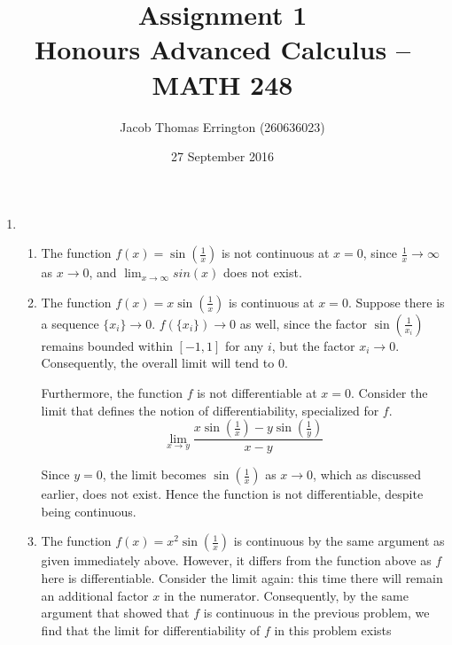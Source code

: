 \documentclass[letterpaper,11pt]{article}
\author{Jacob Thomas Errington (260636023)}
\title{Assignment 1\\Honours Advanced Calculus -- MATH 248}
\date{27 September 2016}
\begin{document}
\maketitle

\begin{enumerate}
    \item
        \begin{enumerate}
            \item
                The function $f(x) = \sin{(\frac{1}{x})}$ is not continuous at
                $x = 0$, since $\frac{1}{x} \to \infty$ as $x \to 0$, and
                $\lim_{x\to\infty} {sin(x)}$ does not exist.

            \item
                The function $f(x) = x \sin{(\frac{1}{x})}$ is continuous at
                $x = 0$. Suppose there is a sequence $\{x_i\} \to 0$.
                $f(\{x_i\}) \to 0$ as well, since the factor
                $\sin{(\frac{1}{x_i})}$ remains bounded within $[-1, 1]$ for
                any $i$, but the factor $x_i \to 0$. Consequently, the overall
                limit will tend to $0$.

                Furthermore, the function $f$ is not differentiable at $x=0$.
                Consider the limit that defines the notion of
                differentiability, specialized for $f$.
                \begin{equation*}
                    \lim_{x\to y}{
                        \frac
                        {x \sin{(\frac{1}{x})} - y \sin{(\frac{1}{y})}}
                        {x - y}
                    }
                \end{equation*}

                Since $y=0$, the limit becomes $\sin{(\frac{1}{x})}$ as
                $x \to 0$, which as discussed earlier, does not exist. Hence
                the function is not differentiable, despite being continuous.

            \item
                The function $f(x) = x^2 \sin{(\frac{1}{x})}$ is continuous by
                the same argument as given immediately above. However, it
                differs from the function above as $f$ here is differentiable.
                Consider the limit again: this time there will remain an
                additional factor $x$ in the numerator. Consequently, by the
                same argument that showed that $f$ is continuous in the
                previous problem, we find that the limit for differentiability
                of $f$ in this problem exists
        \end{enumerate}


\end{enumerate}
\end{document}
